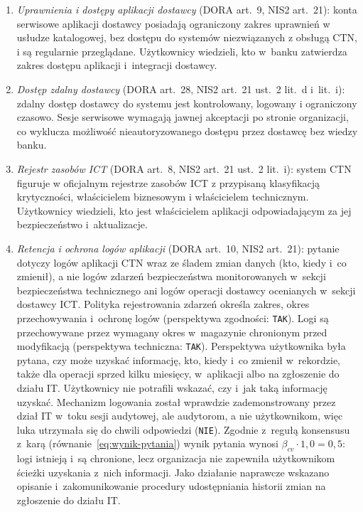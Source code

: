 \begin{enumerate}[label=(\roman*)]
  \item \textit{Uprawnienia i dostępy aplikacji dostawcy} (DORA art.~9, NIS2 art.~21): konta serwisowe aplikacji dostawcy posiadają ograniczony zakres uprawnień w usłudze katalogowej, bez dostępu do systemów niezwiązanych z obsługą CTN, i są regularnie przeglądane. Użytkownicy wiedzieli, kto w~banku zatwierdza zakres dostępu aplikacji i~integracji dostawcy.

  \item \textit{Dostęp zdalny dostawcy} (DORA art.~28, NIS2 art.~21 ust.~2 lit.~d i~lit.~i): zdalny dostęp dostawcy do systemu jest kontrolowany, logowany i ograniczony czasowo. Sesje serwisowe wymagają jawnej akceptacji po stronie organizacji, co wyklucza możliwość nieautoryzowanego dostępu przez dostawcę bez wiedzy banku.

  \item \textit{Rejestr zasobów ICT} (DORA art.~8, NIS2 art.~21 ust.~2 lit.~i): system CTN figuruje w oficjalnym rejestrze zasobów ICT z przypisaną klasyfikacją krytyczności, właścicielem biznesowym i właścicielem technicznym. Użytkownicy wiedzieli, kto jest właścicielem aplikacji odpowiadającym za jej bezpieczeństwo i~aktualizacje.

  \item \textit{Retencja i ochrona logów aplikacji} (DORA art.~10, NIS2 art.~21): pytanie dotyczy logów aplikacji CTN wraz ze śladem zmian danych (kto, kiedy i~co zmienił), a nie logów zdarzeń bezpieczeństwa monitorowanych w~sekcji bezpieczeństwa technicznego ani logów operacji dostawcy ocenianych w~sekcji dostawcy ICT. Polityka rejestrowania zdarzeń określa zakres, okres przechowywania i~ochronę logów (perspektywa zgodności: \texttt{TAK}). Logi są przechowywane przez wymagany okres w~magazynie chronionym przed modyfikacją (perspektywa techniczna: \texttt{TAK}). Perspektywa użytkownika była pytana, czy może uzyskać informację, kto, kiedy i~co zmienił w~rekordzie, także dla operacji sprzed kilku miesięcy, w~aplikacji albo na zgłoszenie do działu IT. Użytkownicy nie potrafili wskazać, czy i~jak taką informację uzyskać. Mechanizm logowania został wprawdzie zademonstrowany przez dział IT w~toku sesji audytowej, ale audytorom, a nie użytkownikom, więc luka utrzymała się do chwili odpowiedzi (\texttt{NIE}). Zgodnie z~regułą konsensusu z~karą (równanie~\eqref{eq:wynik-pytania}) wynik pytania wynosi $\beta_{cv} \cdot 1{,}0 = 0{,}5$: logi istnieją i~są chronione, lecz organizacja nie zapewniła użytkownikom ścieżki uzyskania z~nich informacji. Jako działanie naprawcze wskazano opisanie i~zakomunikowanie procedury udostępniania historii zmian na zgłoszenie do działu IT.


\end{enumerate}
